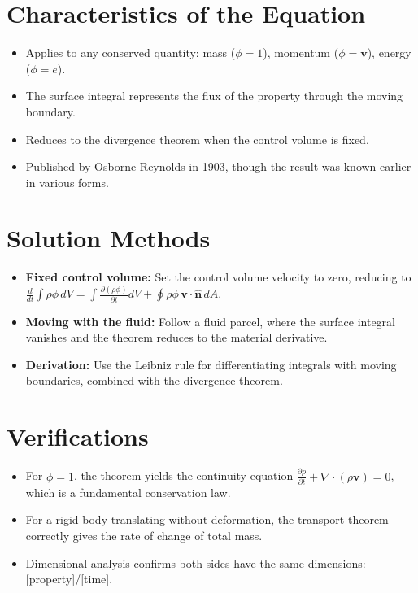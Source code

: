 \section*{Characteristics of the Equation}

\begin{itemize}
    \item Applies to any conserved quantity: mass ($\phi = 1$), momentum ($\phi = \mathbf{v}$), energy ($\phi = e$).
    \item The surface integral represents the flux of the property through the moving boundary.
    \item Reduces to the divergence theorem when the control volume is fixed.
    \item Published by Osborne Reynolds in 1903, though the result was known earlier in various forms.
\end{itemize}
\section*{Solution Methods}

\begin{itemize}
    \item \textbf{Fixed control volume:} Set the control volume velocity to zero, reducing to $\frac{d}{dt}\int\rho\phi\,dV = \int\frac{\partial(\rho\phi)}{\partial t}dV + \oint\rho\phi\,\mathbf{v}\cdot\hat{\mathbf{n}}\,dA$.
    \item \textbf{Moving with the fluid:} Follow a fluid parcel, where the surface integral vanishes and the theorem reduces to the material derivative.
    \item \textbf{Derivation:} Use the Leibniz rule for differentiating integrals with moving boundaries, combined with the divergence theorem.
\end{itemize}
\section*{Verifications}

\begin{itemize}
    \item For $\phi = 1$, the theorem yields the continuity equation $\frac{\partial\rho}{\partial t} + \nabla\cdot(\rho\mathbf{v}) = 0$, which is a fundamental conservation law.
    \item For a rigid body translating without deformation, the transport theorem correctly gives the rate of change of total mass.
    \item Dimensional analysis confirms both sides have the same dimensions: [property]/[time].
\end{itemize}
